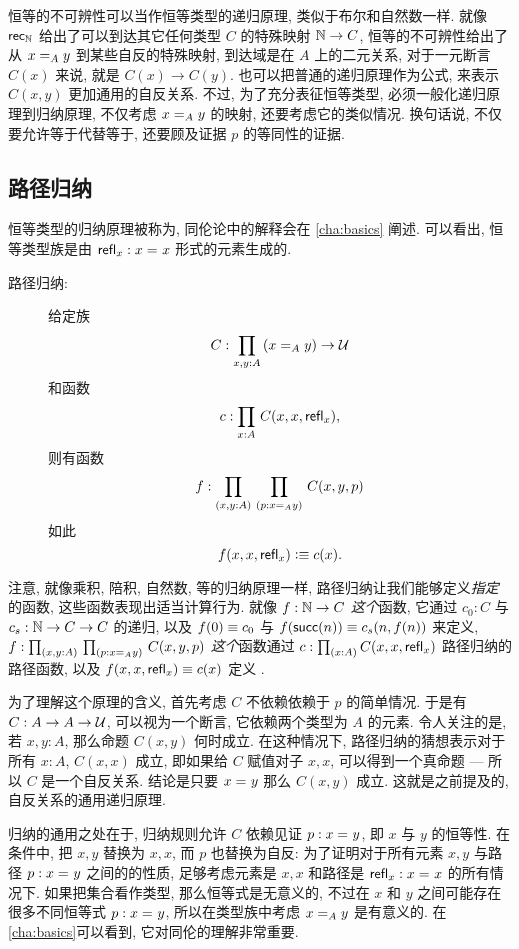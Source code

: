 恒等的不可辨性可以当作恒等类型的递归原理, 类似于布尔和自然数一样.
就像 $\rec{\nat}$ 给出了可以到达其它任何类型 $C$ 的特殊映射 $\nat\to C$, 恒等的不可辨性给出了从 $\id[A] x y$ 到某些自反的特殊映射, 到达域是在 $A$ 上的二元关系, 对于一元断言 $C(x)$ 来说, 就是 $C(x) \to C(y)$.
也可以把普通的递归原理作为公式, 来表示 $C(x,y)$ 更加通用的自反关系.
不过, 为了充分表征恒等类型, 必须一般化递归原理到归纳原理, 不仅考虑 $\id[A] x y$ 的映射, 还要考虑它的类似情况.
换句话说, 不仅要允许等于代替等于, 还要顾及证据 $p$ 的等同性的证据.

\subsection{路径归纳}

恒等类型的归纳原理被称为, %
%
同伦论中的解释会在 \cref{cha:basics} 阐述.
可以看出, 恒等类型族是由 $\refl{x}: \id{x}{x}$ 形式的元素生成的.

\begin{description}
    \item[路径归纳:]
    给定族
    \[ C : \prd{x,y:A} (\id[A]{x}{y}) \to \UU \]
    和函数
    \[ c : \prd{x:A} C(x,x,\refl{x}),\]
    则有函数
    \[ f : \prd{x,y:A}{p:\id[A]{x}{y}} C(x,y,p) \]
    如此
    \[ f(x,x,\refl{x}) \defeq c(x). \]
\end{description}

注意, 就像乘积, 陪积, 自然数, 等的归纳原理一样, 路径归纳让我们能够定义\emph{指定}的函数, 这些函数表现出适当计算行为.
就像 $f:\nat\to C$ \emph{这个}函数, 它通过 $c_0:C$ 与 $c_s:\nat \to C \to C$ 的递归, 以及 $f(0)\jdeq c_0$ 与 $f(\suc(n))\jdeq c_s(n,f(n))$ 来定义, $f : \dprd{x,y:A}{p:\id[A]{x}{y}} C(x,y,p)$ \emph{这个}函数通过 $c : \prd{x:A} C(x,x,\refl{x})$ 路径归纳的路径函数, 以及 $f(x,x,\refl{x}) \jdeq c(x)$ 定义 .

为了理解这个原理的含义, 首先考虑 $C$ 不依赖依赖于 $p$ 的简单情况.
于是有 $C:A\to A\to \UU$, 可以视为一个断言, 它依赖两个类型为 $A$ 的元素.
令人关注的是, 若 $x,y:A$, 那么命题 $C(x,y)$ 何时成立.
在这种情况下, 路径归纳的猜想表示对于所有 $x:A$, $C(x,x)$ 成立, 即如果给 $C$ 赋值对子 $x, x$, 可以得到一个真命题 --- 所以 $C$ 是一个自反关系.
结论是只要 $\id{x}{y}$ 那么 $C(x,y)$ 成立.
这就是之前提及的, 自反关系的通用递归原理.

归纳的通用之处在于, 归纳规则允许 $C$ 依赖见证 $p:\id{x}{y}$, 即 $x$ 与 $y$ 的恒等性.
在条件中, 把 $x, y$ 替换为 $x,x$, 而 $p$ 也替换为自反: 为了证明对于所有元素 $x,y$ 与路径 $p : \id{x}{y}$ 之间的的性质, 足够考虑元素是 $x,x$ 和路径是 $\refl{x}: \id{x}{x}$ 的所有情况下.
如果把集合看作类型, 那么恒等式是无意义的, 不过在 $x$ 和 $y$ 之间可能存在很多不同恒等式 $p : \id{x}{y}$, 所以在类型族中考虑 $\id[A]{x}{y}$ 是有意义的.
在\cref{cha:basics}可以看到, 它对同伦的理解非常重要.

